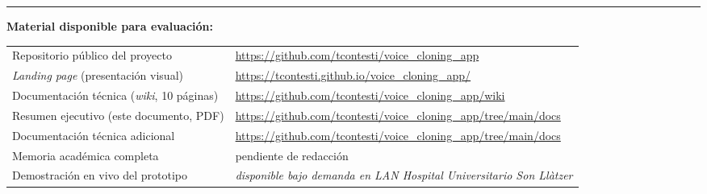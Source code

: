 \documentclass[11pt,a4paper]{article}
\begin{document}
\vspace{2pt}
\hrule
\vspace{3pt}

{\small
\textbf{Material disponible para evaluación:}\\[1pt]
\begin{tabular}{@{}ll@{}}
Repositorio público del proyecto & \url{https://github.com/tcontesti/voice_cloning_app} \\
\emph{Landing page} (presentación visual) & \url{https://tcontesti.github.io/voice_cloning_app/} \\
Documentación técnica (\emph{wiki}, 10 páginas) & \url{https://github.com/tcontesti/voice_cloning_app/wiki} \\
Resumen ejecutivo (este documento, PDF) & \url{https://github.com/tcontesti/voice_cloning_app/tree/main/docs} \\
Documentación técnica adicional & \url{https://github.com/tcontesti/voice_cloning_app/tree/main/docs} \\
Memoria académica completa & pendiente de redacción \\
Demostración en vivo del prototipo & \emph{disponible bajo demanda en LAN Hospital Universitario Son Llàtzer} \\
\end{tabular}}
\end{document}
